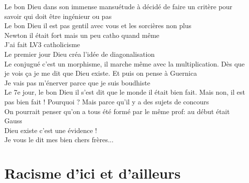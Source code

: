 \documentclass[french, a4paper, openany]{book}
\begin{document}
	\noindent \og Le bon Dieu dans son immense mansuétude à décidé de faire un critère pour savoir qui doit être ingénieur ou pas \fg \\
	\og Le bon Dieu il est pas gentil avec vous et les sorcières non plus \fg \\
	\og Newton il était fort mais un peu catho quand même \fg \\
	\og J'ai fait LV3 catholicisme \fg \\
	\og Le premier jour Dieu créa l'idée de diagonalisation \fg \\
	\og Le conjugué c'est un morphisme, il marche même avec la multiplication. Dès que je vois ça je me dit que Dieu existe. Et puis on pense à Guernica \fg \\
	\og Je vais pas m'énerver parce que je suis boudhiste \fg \\
	\og Le 7e jour, le bon Dieu il s'est dit que le monde il était bien fait. Mais non, il est pas bien fait ! Pourquoi ? Mais parce qu'il y a des sujets de concours \fg \\
	\og On pourrait penser qu'on a tous été formé par le même prof: au début était Gauss \fg \\
	\og Dieu existe c'est une évidence ! \fg \\
	\og Je vous le dit mes bien chers frères... \fg \\

\section{Racisme d'ici et d'ailleurs}
\end{document}
